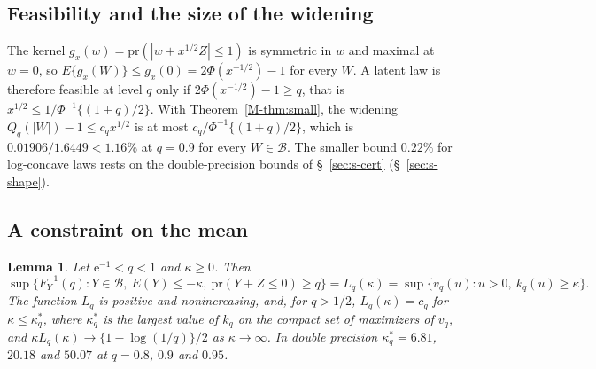 \documentclass[11pt]{article}
\renewcommand{\_}{\usc\allowbreak}
\newtheorem{lemma}{Lemma}
\newcommand{\pr}{\mathrm{pr}}
\begin{document}
\subsection*{Feasibility and the size of the widening}\label{sec:s-feasible}

The kernel $g_x(w) = \pr(|w + x^{1/2}Z| \le 1)$ is symmetric in $w$ and maximal at $w = 0$, so $E\{g_x(W)\} \le g_x(0) = 2\Phi(x^{-1/2}) - 1$ for every $W$. A latent law is therefore feasible at level $q$ only if $2\Phi(x^{-1/2}) - 1 \ge q$, that is $x^{1/2} \le 1/\Phi^{-1}\{(1+q)/2\}$. With Theorem~\ref{M-thm:small}, the widening $Q_q(|W|) - 1 \le c_q x^{1/2}$ is at most $c_q/\Phi^{-1}\{(1+q)/2\}$, which is $0.01906/1.6449 < 1.16\%$ at $q = 0.9$ for every $W \in \mathcal B$. The smaller bound $0.22\%$ for log-concave laws rests on the double-precision bounds of \S~\ref{sec:s-cert} (\S~\ref{sec:s-shape}).

\subsection*{A constraint on the mean}

\begin{lemma}\label{lem:meanonesided}
Let $\mathrm{e}^{-1} < q < 1$ and $\kappa \ge 0$. Then
\[
\sup\{F_Y^{-1}(q) : Y \in \mathcal B,\ E(Y) \le -\kappa,\ \pr(Y + Z \le 0) \ge q\} = L_q(\kappa) = \sup\{v_q(u) : u > 0,\ k_q(u) \ge \kappa\}.
\]
The function $L_q$ is positive and nonincreasing, and, for $q > 1/2$, $L_q(\kappa) = c_q$ for $\kappa \le \kappa^*_q$, where $\kappa^*_q$ is the largest value of $k_q$ on the compact set of maximizers of $v_q$, and $\kappa L_q(\kappa) \to \{1 - \log(1/q)\}/2$ as $\kappa \to \infty$. In double precision $\kappa^*_q = 6.81$, $20.18$ and $50.07$ at $q = 0.8$, $0.9$ and $0.95$.
\end{lemma}
\end{document}
